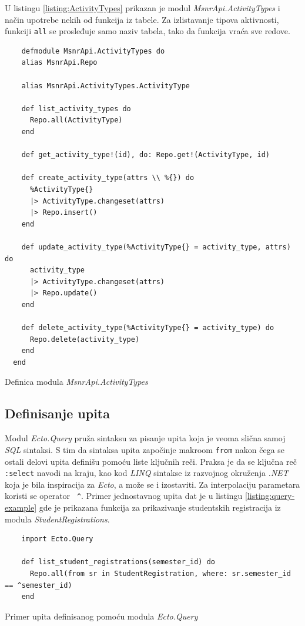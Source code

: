 \documentclass[12pt,oneside]{memoir}
\begin{document}
U listingu \ref{listing:ActivityTypes} prikazan je modul
\emph{MsnrApi.ActivityTypes} i način upotrebe nekih od funkcija iz tabele. Za izlistavanje tipova aktivnosti,
funkciji \texttt{all} se prosleđuje samo naziv tabela, tako da funkcija vraća sve redove.
\begin{listing}[!h]
  \begin{verbatim}
    defmodule MsnrApi.ActivityTypes do
    alias MsnrApi.Repo
  
    alias MsnrApi.ActivityTypes.ActivityType
  
    def list_activity_types do
      Repo.all(ActivityType)
    end
  
    def get_activity_type!(id), do: Repo.get!(ActivityType, id)
  
    def create_activity_type(attrs \\ %{}) do
      %ActivityType{}
      |> ActivityType.changeset(attrs)
      |> Repo.insert()
    end
  
    def update_activity_type(%ActivityType{} = activity_type, attrs) do
      activity_type
      |> ActivityType.changeset(attrs)
      |> Repo.update()
    end
  
    def delete_activity_type(%ActivityType{} = activity_type) do
      Repo.delete(activity_type)
    end
  end
\end{verbatim}
\caption{Definica modula \emph{MsnrApi.ActivityTypes}}
\label{listing:ActivityTypes}
\end{listing}

\subsection{Definisanje upita}
Modul \emph{Ecto.Query} pruža sintaksu za pisanje upita koja je veoma slična samoj \emph{SQL} sintaksi. 
S tim da sintaksa upita započinje makroom \texttt{from} nakon čega se ostali delovi upita definišu pomoću liste ključnih reči.
Praksa je da se ključna reč \texttt{:select} navodi na kraju, kao kod \emph{LINQ} \cite{linq} sintakse iz razvojnog okruženja \emph{.NET}
koja je bila inspiracija za \emph{Ecto}, a može se i izostaviti. Za interpolaciju parametara koristi se operator \texttt{ \^{}}.
Primer jednostavnog upita dat je u listingu \ref{listing:query-example} gde je prikazana funkcija za prikazivanje studentskih
registracija iz modula \emph{StudentRegistrations}.
\begin{listing}[h]
  \begin{verbatim}
    import Ecto.Query

    def list_student_registrations(semester_id) do
      Repo.all(from sr in StudentRegistration, where: sr.semester_id == ^semester_id)
    end
  \end{verbatim}
\caption{Primer upita definisanog pomoću modula \emph{Ecto.Query}}
\label{listing:query-example}
\end{listing}
\end{document}
